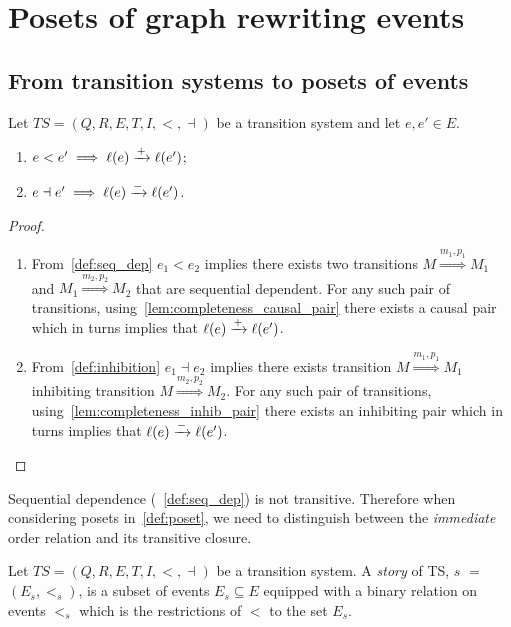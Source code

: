 \section{Posets of graph rewriting events}

\subsection{From transition systems to posets of events}

\begin{lemma}
  \label{lemma:pos_infl}
  Let $TS = (Q,R,E,T,I,<,\dashv)$ be a transition system and let $e,e' \in E$.
  \begin{enumerate}
  \item $e< e'\implies \ell(e)\xrightarrow{+}\ell(e')$;
  \item $e\dashv e' \implies\ell(e)\xrightarrow{-}\ell(e')$.
  \end{enumerate}
\end{lemma}
\begin{proof}
  \begin{enumerate}
  \item From~\autoref{def:seq_dep} $e_1 < e_2$ implies there exists two transitions $M\overset{m_1,p_1}{\Rightarrow} M_1$ and $M_1\overset{m_2,p_2}{\Rightarrow} M_2$ that are sequential dependent. For any such pair of transitions, using~\autoref{lem:completeness_causal_pair} there exists a causal pair which in turns implies that $\ell(e)\xrightarrow{+}\ell(e')$.

  \item From~\autoref{def:inhibition} $e_1 \dashv e_2$ implies there exists transition $M\overset{m_1,p_1}{\Rightarrow} M_1$ inhibiting transition $M\overset{m_2,p_2}{\Rightarrow} M_2$. For any such pair of transitions, using~\autoref{lem:completeness_inhib_pair} there exists an inhibiting pair which in turns implies that $\ell(e)\xrightarrow{-}\ell(e')$.
  \end{enumerate}
\end{proof}

\begin{remark}
  Sequential dependence (~\autoref{def:seq_dep}) is not transitive. Therefore when considering posets in~\autoref{def:poset}, we need to distinguish between the \emph{immediate} order relation and its transitive closure.
\end{remark}

\begin{definition}[Story]
  Let $TS = (Q,R,E,T,I,<,\dashv)$ be a transition system.
  A \emph{story} of TS, $s$ $=$ $(E_s,<_s)$, is a subset of events $E_s\subseteq E$ equipped with a binary relation on events $<_s$ which is the restrictions of $<$ to the set $E_s$.
\end{definition}

